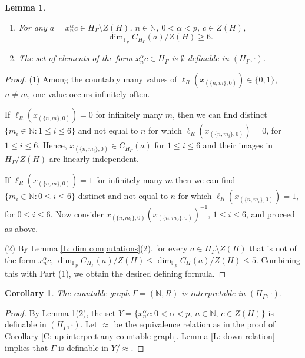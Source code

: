 \documentclass[11pt]{amsart}
\theoremstyle{plain}
\newtheorem{corollary}[theorem]{Corollary}
\newtheorem{lemma}[theorem]{Lemma}
\theoremstyle{definition}
\theoremstyle{remark}
\numberwithin{equation}{section}
\begin{document}
\begin{lemma}\label{L:down vertex n}
    \begin{enumerate}
        \item For any $a=x_n^\alpha c\in H_\Gamma\setminus Z(H)$, $n\in \mathbb{N}$, $0<\alpha<p$, $c\in Z(H)$, \[\dim_{\mathbb{F}_p}C_{H_\Gamma}(a)/Z(H) \geq 6.\]
        
        \item The set of elements of the form $x_n^\alpha c\in H_\Gamma$ is $\emptyset$-definable in $(H_\Gamma,\cdot)$.
    \end{enumerate}
\end{lemma}
\begin{proof}
    (1) Among the countably many values of  $\ell_R(x_{(\{n,m\},0)})\in \{0,1\}$, $n\neq m$, one value occurs infinitely often. 
    
    If $\ell_R(x_{(\{n,m\},0)})=0$ for infinitely many $m$, then we can find distinct $\{m_i\in \mathbb{N}:1\leq i\leq 6\}$ and not equal to $n$ for which $\ell_R(x_{(\{n,m_i\},0)})=0$, for $1\leq i\leq 6$. Hence, $x_{(\{n,m_i\},0)}\in C_{H_\Gamma}(a)$ for $1\leq i\leq 6$ and their images in $H_\Gamma/Z(H)$ are linearly independent.

    If $\ell_R(x_{(\{n,m\},0)})=1$ for infinitely many $m$ then we can find $\{m_i\in \mathbb{N}: 0\leq i\leq 6\}$ distinct and not equal to $n$ for which $\ell_R(x_{(\{n,m_i\},0)})=1$, for $0\leq i\leq 6$. Now  consider $x_{(\{n,m_i\},0)}(x_{(\{n,m_0\},0)})^{-1}$, $1\leq i\leq 6$, and proceed as above.

(2) By Lemma \ref{L: dim computations}(2), for every $a\in H_\Gamma\setminus Z(H)$ that is not of the form $x_n^\alpha c$, $\dim_{\mathbb{F}_p}C_{H_\Gamma}(a)/Z(H)\leq \dim_{\mathbb{F}_p}C_H(a)/Z(H)\leq 5$. Combining this with Part (1), we obtain the desired defining formula. 
\end{proof}

\begin{corollary}
    The countable graph $\Gamma=(\mathbb{N},R)$ is interpretable in $(H_\Gamma,\cdot)$.
\end{corollary}
\begin{proof}
    By Lemma \ref{L:down vertex n}(2), the set $Y=\{x_n^\alpha c:0<\alpha<p,\, n\in\mathbb{N},\, c\in Z(H)\}$ is definable in $(H_\Gamma,\cdot)$. Let $\approx$ be the equivalence relation as in the proof of Corollary \ref{C: up interpret any countable graph}. Lemma \ref{L: down relation} implies that $\Gamma$ is definable in $Y/\approx$.
\end{proof}
\end{document}
